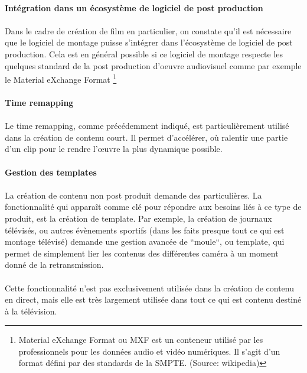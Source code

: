 \paragraph{Intégration dans un écosystème de logiciel de post production}

\paragraph{}
Dans le cadre de création de film en particulier, on constate qu'il est nécessaire
que le logiciel de montage puisse s'intégrer dans l'écosystème de logiciel de post
production. Cela est en général possible si ce logiciel de montage respecte les
quelques standard de la post production d'oeuvre audiovisuel comme par exemple le
Material eXchange Format \footnote{Material eXchange Format ou MXF est un conteneur
utilisé par les professionnels pour les données audio et vidéo numériques.
Il s'agit d'un format défini par des standards de la SMPTE. (Source: wikipedia)}

\paragraph{Time remapping}
\paragraph{ }
Le time remapping, comme précédemment indiqué, est particulièrement utilisé dans
la création de contenu court. Il permet d'accélérer, où ralentir une partie d'un
clip pour le rendre l'œuvre la plus dynamique possible.

\paragraph{Gestion des templates}
\paragraph{ }
La création de contenu non post produit demande des particulières. La fonctionnalité
qui apparaît comme clé pour répondre aux besoins liés à ce type de produit, est la
création de template. Par exemple, la création de journaux télévisés, ou autres évènements
sportifs (dans les faits presque tout ce qui est montage télévisé) demande une gestion avancée de ``moule``,
ou template, qui permet de simplement lier les contenus des différentes caméra
à un moment donné de la retransmission.

\paragraph{ }
Cette fonctionnalité n'est pas exclusivement utilisée dans la création de contenu en direct, mais
elle est très largement utilisée dans tout ce qui est contenu destiné à la télévision.

